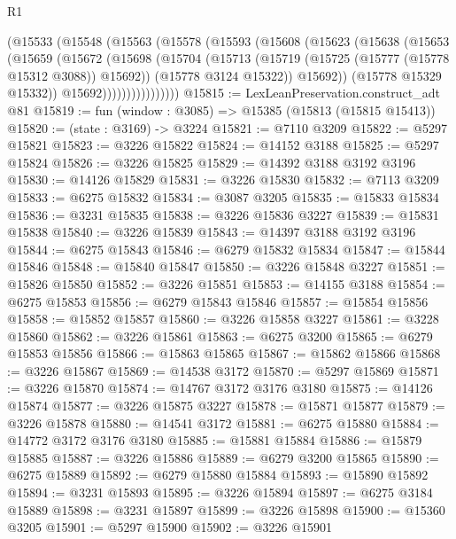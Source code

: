 \begin{lexlean}{R1}
\begin{coremodule}
                (@15533
                  (@15548
                    (@15563
                      (@15578
                        (@15593
                          (@15608
                            (@15623
                              (@15638
                                (@15653
                                  (@15659
                                    (@15672
                                      (@15698
                                        (@15704
                                          (@15713
                                            (@15719 (@15725 (@15777 (@15778 @15312 @3088)) @15692))
                                            (@15778 @3124 @15322))
                                          @15692))
                                      (@15778 @15329 @15332))
                                    @15692))))))))))))))))
@15815 := LexLeanPreservation.construct_adt @81
@15819 := fun (window : @3085) => @15385 (@15813 (@15815 @15413))
@15820 := (state : @3169) -> @3224
@15821 := @7110 @3209
@15822 := @5297 @15821
@15823 := @3226 @15822
@15824 := @14152 @3188
@15825 := @5297 @15824
@15826 := @3226 @15825
@15829 := @14392 @3188 @3192 @3196
@15830 := @14126 @15829
@15831 := @3226 @15830
@15832 := @7113 @3209
@15833 := @6275 @15832
@15834 := @3087 @3205
@15835 := @15833 @15834
@15836 := @3231 @15835
@15838 := @3226 @15836 @3227
@15839 := @15831 @15838
@15840 := @3226 @15839
@15843 := @14397 @3188 @3192 @3196
@15844 := @6275 @15843
@15846 := @6279 @15832 @15834
@15847 := @15844 @15846
@15848 := @15840 @15847
@15850 := @3226 @15848 @3227
@15851 := @15826 @15850
@15852 := @3226 @15851
@15853 := @14155 @3188
@15854 := @6275 @15853
@15856 := @6279 @15843 @15846
@15857 := @15854 @15856
@15858 := @15852 @15857
@15860 := @3226 @15858 @3227
@15861 := @3228 @15860
@15862 := @3226 @15861
@15863 := @6275 @3200
@15865 := @6279 @15853 @15856
@15866 := @15863 @15865
@15867 := @15862 @15866
@15868 := @3226 @15867
@15869 := @14538 @3172
@15870 := @5297 @15869
@15871 := @3226 @15870
@15874 := @14767 @3172 @3176 @3180
@15875 := @14126 @15874
@15877 := @3226 @15875 @3227
@15878 := @15871 @15877
@15879 := @3226 @15878
@15880 := @14541 @3172
@15881 := @6275 @15880
@15884 := @14772 @3172 @3176 @3180
@15885 := @15881 @15884
@15886 := @15879 @15885
@15887 := @3226 @15886
@15889 := @6279 @3200 @15865
@15890 := @6275 @15889
@15892 := @6279 @15880 @15884
@15893 := @15890 @15892
@15894 := @3231 @15893
@15895 := @3226 @15894
@15897 := @6275 @3184 @15889
@15898 := @3231 @15897
@15899 := @3226 @15898
@15900 := @15360 @3205
@15901 := @5297 @15900
@15902 := @3226 @15901

\end{coremodule}
\end{lexlean}
